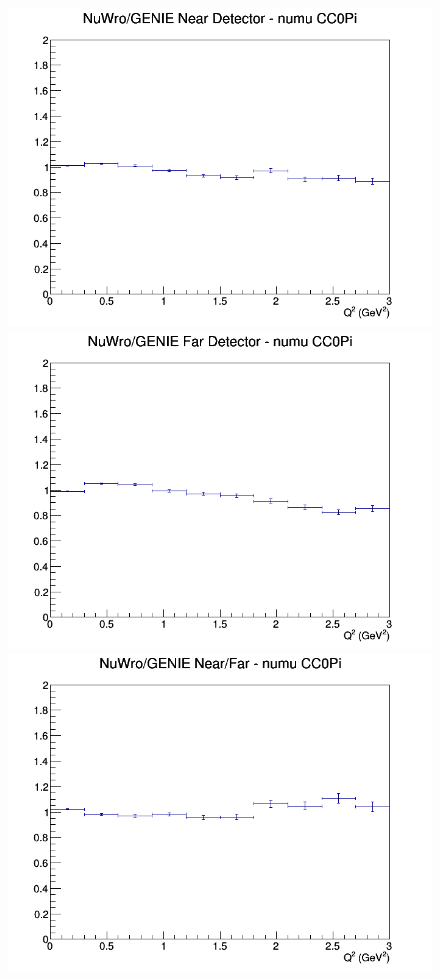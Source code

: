 \documentclass[12pt]{article}
\begin{document}
\begin{figure}[h]
\endminipage
\newline
{}
\includegraphics[width=\linewidth]{eff_Q2/GAr/ratios/CC0Pi_NuWro_GENIE_numu_near_Q2.png}
\endminipage
{}
\includegraphics[width=\linewidth]{eff_Q2/GAr/ratios/CC0Pi_NuWro_GENIE_numu_far_Q2.png}
\endminipage
{}
\includegraphics[width=\linewidth]{eff_Q2/GAr/ratios/CC0Pi_NuWro_GENIE_numu_NF_Q2.png}
\endminipage
\newline
\end{figure}
\clearpage
\end{document}
